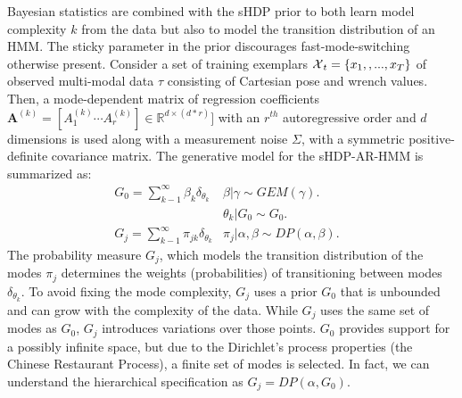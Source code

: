 \documentclass[letterpaper, 10 pt, conference]{ieeeconf}  %
\begin{document}
Bayesian statistics are combined with the sHDP prior to both learn model complexity $k$ from the data but also to model the transition distribution of an HMM. The sticky parameter in the prior discourages fast-mode-switching otherwise present. Consider a set of training exemplars $\mbox{$\mathcal X$}_t=\{ x_1, ,..., x_T\}$ of observed multi-modal data $\tau$ consisting of Cartesian pose and wrench values. Then, a mode-dependent matrix of regression coefficients $\mathbf{A}^{(k)}=[A_1^{(k)} \cdots A_r^{(k)}] \in \mathbb{R}^{d\times(d*r)}]$ with an $r^{th}$ autoregressive order and $d$ dimensions is used along with a measurement noise $\Sigma$, with a symmetric positive-definite covariance matrix. The generative model for the sHDP-AR-HMM is summarized as: 
\begin{eqnarray}
	G_0=\sum_{k-1}^\infty \beta_k \delta_{\theta_k} & \beta | \gamma \sim GEM(\gamma). 					& \nonumber \\
													& \theta_k | G_0 \sim G_0. 							& \\
    G_j = \sum_{k-1}^\infty \pi_{jk} \delta_{\theta_k} 	& \pi_j | \alpha,\beta \sim DP(\alpha,\beta). 	& \nonumber
\end{eqnarray}
The probability measure $G_j$, which models the transition distribution of the modes $\pi_j$ determines the weights (probabilities) of transitioning between modes $\delta_{\theta_k}$. To avoid fixing the mode complexity, $G_j$ uses a prior $G_0$ that is unbounded and can grow with the complexity of the data. While $G_j$ uses the same set of modes as $G_0$, $G_j$ introduces variations over those points. $G_0$ provides support for a possibly infinite space, but due to the Dirichlet's process properties (\ie the Chinese Restaurant Process), a finite set of modes is selected. In fact, we can understand the hierarchical specification as $G_j=DP(\alpha,G_0)$. 
\end{document}
